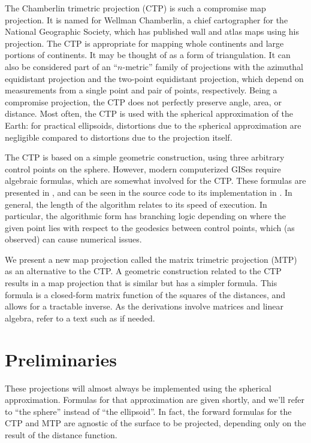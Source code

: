 \documentclass[]{interact}
\begin{document}
The Chamberlin trimetric projection (CTP) is such a compromise map projection.
It is named for Wellman Chamberlin, a chief cartographer for the National
Geographic Society, which has published wall and atlas maps using his
projection. \citep{christensen} The CTP is appropriate for mapping whole
continents and large portions of continents. It may be thought of as a form of
triangulation. It can also be considered part of an ``$n$-metric'' family of
projections with the azimuthal equidistant projection and the two-point
equidistant projection, which depend on measurements from a single point and
pair of points, respectively. \citep{snyder87} Being a compromise projection,
the CTP does not perfectly preserve angle, area, or distance. Most often, the
CTP is used with the spherical approximation of the Earth: for practical
ellipsoids, distortions due to the spherical approximation are negligible
compared to distortions due to the projection itself.

The CTP is based on a simple geometric construction, using three arbitrary
control points on the sphere. However, modern computerized GISes require
algebraic formulas, which are somewhat involved for the CTP.
These formulas are presented in \citet{christensen},
and can be seen in the source code to its implementation in \citet{proj}.
In general, the length of the algorithm relates to its speed of execution.
In particular, the algorithmic form has branching logic depending on
where the given point lies with respect to the geodesics between control points,
which (as \citet{christensen} observed) can cause numerical issues.

We present a new map projection called the matrix trimetric projection
(MTP) as an alternative to the CTP. A geometric construction related to the
CTP results in a map projection that is similar but has a simpler formula. This
formula is a closed-form matrix function of the squares of the distances, and
allows for a tractable inverse. As the derivations involve matrices and linear
algebra, refer to a text such as \citet{strang80} if needed.

\section{Preliminaries}
These projections will almost always be implemented using the spherical
approximation. Formulas for that approximation are given shortly, and we'll
refer to ``the sphere'' instead of ``the ellipsoid''. In fact, the forward
formulas for the CTP and MTP are agnostic of the surface to be projected,
depending only on the result of the distance function.
\end{document}
